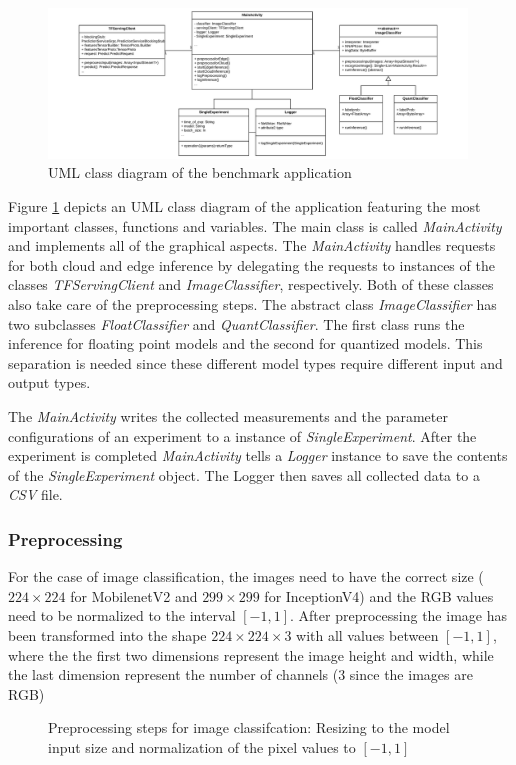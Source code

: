 \begin{figure}[htb]
\centering
\includegraphics[width=0.99\textwidth]{./Bilder/UML.pdf}
\caption{UML class diagram of the benchmark application}
\label{fig:UML}
\end{figure}
Figure \ref{fig:UML} depicts an UML class diagram of the application featuring the most important classes, functions and variables. 
The main class is called \emph{MainActivity} and implements all of the graphical aspects. 
The \emph{MainActivity} handles requests for both cloud and edge inference by delegating the requests to instances of the classes \emph{TFServingClient} and \emph{ImageClassifier}, respectively. Both of these classes also take care of the preprocessing steps.
The abstract class \emph{ImageClassifier} has two subclasses \emph{FloatClassifier} and \emph{QuantClassifier}. The first class runs the inference for floating point models and the second for quantized models.
This separation is needed since these different model types require different input and output types.

The \emph{MainActivity} writes the collected measurements and the parameter configurations of an experiment to a instance of \emph{SingleExperiment}. After the experiment is completed \emph{MainActivity} tells a \emph{Logger} instance to save the contents of the \emph{SingleExperiment} object. The Logger then saves all collected data to a \emph{CSV} file.

\subsubsection{Preprocessing}
For the case of image classification, the images need to have the correct size ($224\times224$ for MobilenetV2 and $299\times299$ for InceptionV4) and the RGB values need to be normalized to the interval $[-1,1]$. After preprocessing the image has been transformed into the shape $224\times224\times3$ with all values between $[-1,1]$, where the the first two dimensions represent the image height and width, while the last dimension represent the number of channels (3 since the images are RGB)
\begin{figure}[H]
\centering

\caption{Preprocessing steps for image classifcation: Resizing to the model input size and normalization of the pixel values to $[-1,1]$}
\label{fig:prepro}
\end{figure}
